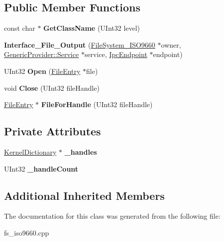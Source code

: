 \subsection*{Public Member Functions}
\begin{DoxyCompactItemize}
\item 
\mbox{\label{class_i_s_o9660_driver_1_1_interface___file___output_a126c81346394299cf8c02965d0fd70c9}} 
const char $\ast$ {\bfseries Get\+Class\+Name} (U\+Int32 level)
\item 
\mbox{\label{class_i_s_o9660_driver_1_1_interface___file___output_a6e9c7ef46302d08628c9fcdb5adc06e2}} 
{\bfseries Interface\+\_\+\+File\+\_\+\+Output} (\hyperlink{class_file_system___i_s_o9660}{File\+System\+\_\+\+I\+S\+O9660} $\ast$owner, \hyperlink{class_generic_provider_1_1_service}{Generic\+Provider\+::\+Service} $\ast$service, \hyperlink{class_ipc_endpoint}{Ipc\+Endpoint} $\ast$endpoint)
\item 
\mbox{\label{class_i_s_o9660_driver_1_1_interface___file___output_a4d9050fa4df5f84b93c99d5d5e264990}} 
U\+Int32 {\bfseries Open} (\hyperlink{class_i_s_o9660_driver_1_1_file_entry}{File\+Entry} $\ast$file)
\item 
\mbox{\label{class_i_s_o9660_driver_1_1_interface___file___output_a55045f95f559b3aa96879e95d18220b0}} 
void {\bfseries Close} (U\+Int32 file\+Handle)
\item 
\mbox{\label{class_i_s_o9660_driver_1_1_interface___file___output_aa261680b427fb2718e3ea193c6d6aeec}} 
\hyperlink{class_i_s_o9660_driver_1_1_file_entry}{File\+Entry} $\ast$ {\bfseries File\+For\+Handle} (U\+Int32 file\+Handle)
\end{DoxyCompactItemize}
\subsection*{Private Attributes}
\begin{DoxyCompactItemize}
\item 
\mbox{\label{class_i_s_o9660_driver_1_1_interface___file___output_a9ed6bfa64925f57618fc70f2a3276447}} 
\hyperlink{class_kernel_dictionary}{Kernel\+Dictionary} $\ast$ {\bfseries \+\_\+handles}
\item 
\mbox{\label{class_i_s_o9660_driver_1_1_interface___file___output_a958ccfc7bb1c36033395ea466d565f6e}} 
U\+Int32 {\bfseries \+\_\+handle\+Count}
\end{DoxyCompactItemize}
\subsection*{Additional Inherited Members}


The documentation for this class was generated from the following file\+:\begin{DoxyCompactItemize}
\item 
fs\+\_\+iso9660.\+cpp\end{DoxyCompactItemize}

